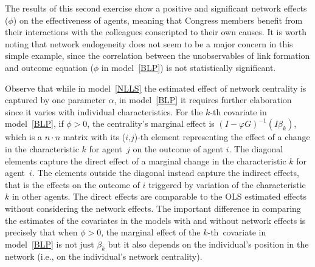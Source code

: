 \documentclass[nojss]{jss}
\begin{document}
The results of this second exercise show a positive and significant network effects ($\phi$) on the effectiveness of agents, meaning that Congress members benefit from their interactions with the colleagues conscripted to their own causes. It is worth noting that network endogeneity does not seem to be a major concern in this simple example, since the correlation between the unobservables of link formation and outcome equation ($\phi$ in model~\ref{BLP}) is not statistically significant.

Observe that while in model~\ref{NLLS} the estimated effect of network centrality is captured by one parameter $\alpha$, in model~\ref{BLP} it requires further elaboration since it varies with individual characteristics. For the $k$-th covariate in model~\ref{BLP}, if $\phi >0$, the centrality's marginal effect is $(I-\varphi G)^{-1}(I\beta _{k})$, which is a $n\cdot n$ matrix with its ($i$,$j$)-th element representing the effect of a change in the characteristic $k$ for agent $\,j$ on the outcome
of agent $i.$ The diagonal elements capture the direct effect of a marginal change in the characteristic $k$ for agent $\,i.$ The elements outside the diagonal instead capture the indirect effects, that is the effects on the outcome of $i$ triggered by variation of the characteristic $k$ in other agents. The direct effects are comparable to the OLS estimated effects without considering the network effects. The important difference in comparing the estimates of the covariates in the models with
and without network effects is precisely that when $\phi>0$, the marginal effect of the $k$-th\ covariate in model~\ref{BLP} is not just $\beta_{k}$ but it also depends on the individual's position in the network (i.e., on the individual's network centrality).
\end{document}
